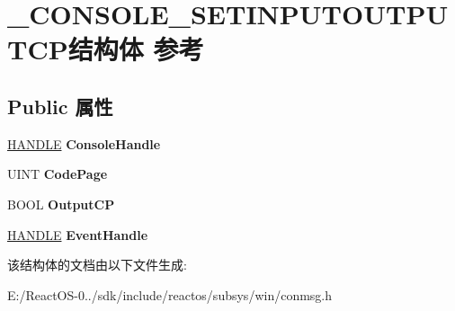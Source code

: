 \hypertarget{struct___c_o_n_s_o_l_e___s_e_t_i_n_p_u_t_o_u_t_p_u_t_c_p}{}\section{\+\_\+\+C\+O\+N\+S\+O\+L\+E\+\_\+\+S\+E\+T\+I\+N\+P\+U\+T\+O\+U\+T\+P\+U\+T\+C\+P结构体 参考}
\label{struct___c_o_n_s_o_l_e___s_e_t_i_n_p_u_t_o_u_t_p_u_t_c_p}
\subsection*{Public 属性}
\begin{DoxyCompactItemize}
\item 
\mbox{\label{struct___c_o_n_s_o_l_e___s_e_t_i_n_p_u_t_o_u_t_p_u_t_c_p_aac4badfd4e0ddad253597d6be06b5585}} 
\hyperlink{interfacevoid}{H\+A\+N\+D\+LE} {\bfseries Console\+Handle}
\item 
\mbox{\label{struct___c_o_n_s_o_l_e___s_e_t_i_n_p_u_t_o_u_t_p_u_t_c_p_abdeb1df42419ba7d8f1b8da7bf8b0e89}} 
U\+I\+NT {\bfseries Code\+Page}
\item 
\mbox{\label{struct___c_o_n_s_o_l_e___s_e_t_i_n_p_u_t_o_u_t_p_u_t_c_p_a14403096b3b548bcfeb3f8d623bcf9dc}} 
B\+O\+OL {\bfseries Output\+CP}
\item 
\mbox{\label{struct___c_o_n_s_o_l_e___s_e_t_i_n_p_u_t_o_u_t_p_u_t_c_p_a4e19d575f244227458089e623e4a2e55}} 
\hyperlink{interfacevoid}{H\+A\+N\+D\+LE} {\bfseries Event\+Handle}
\end{DoxyCompactItemize}


该结构体的文档由以下文件生成\+:\begin{DoxyCompactItemize}
\item 
E\+:/\+React\+O\+S-\/0../sdk/include/reactos/subsys/win/conmsg.\+h\end{DoxyCompactItemize}
